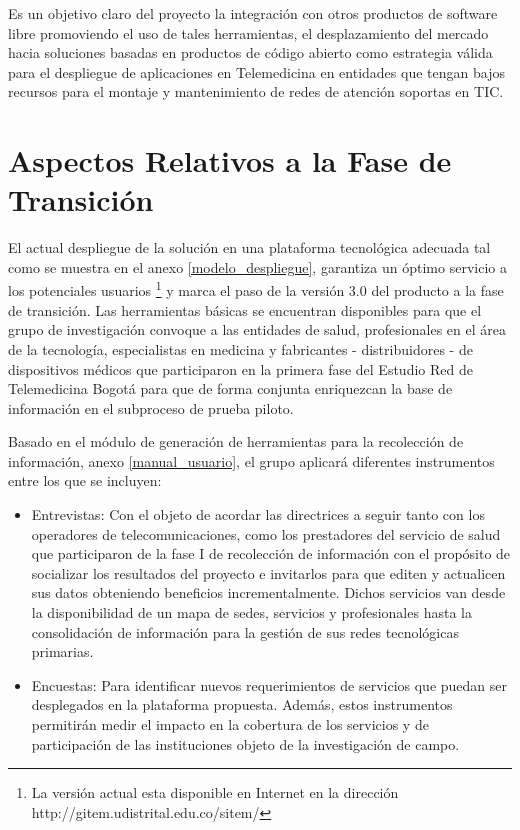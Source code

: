 Es un objetivo claro del proyecto la integración con otros productos de software libre promoviendo el uso de tales herramientas, el desplazamiento del mercado hacia soluciones basadas en productos de código abierto como estrategia válida para el despliegue de aplicaciones en Telemedicina en entidades que tengan bajos recursos para el montaje y mantenimiento de redes de atención soportas en TIC.

\section {Aspectos Relativos a la Fase de Transición}

El actual despliegue de la solución en una plataforma tecnológica adecuada tal como se muestra en el anexo \ref{modelo_despliegue}, garantiza un óptimo servicio a los potenciales usuarios \footnote{La versión actual esta disponible en Internet en la dirección http://gitem.udistrital.edu.co/sitem/} y marca el paso de la versión 3.0 del producto a la fase de transición. Las herramientas básicas se encuentran disponibles para que el grupo de investigación convoque a las entidades de salud, profesionales en el área de la tecnología, especialistas en medicina y fabricantes - distribuidores - de dispositivos médicos que participaron en la primera fase del Estudio Red de Telemedicina Bogotá \cite{aparicio2000} para que de forma conjunta enriquezcan la base de información en el subproceso de prueba piloto.

Basado en el módulo de generación de herramientas para la recolección de información, anexo \ref{manual_usuario}, el grupo aplicará diferentes instrumentos entre los que se incluyen:

\begin{itemize}
\item Entrevistas: Con el objeto de acordar las directrices a seguir tanto con los operadores de telecomunicaciones, como los prestadores del servicio de salud que participaron de la fase I de recolección de información con el propósito de socializar los resultados del proyecto e invitarlos para que editen y actualicen sus datos obteniendo beneficios incrementalmente. Dichos servicios van desde la disponibilidad de un mapa de sedes, servicios y profesionales hasta la consolidación de información para la gestión de sus redes tecnológicas primarias.

\item Encuestas: Para identificar nuevos requerimientos de servicios que puedan ser desplegados en la plataforma propuesta. Además, estos instrumentos permitirán medir el impacto en la cobertura de los servicios y de participación de las instituciones objeto de la investigación de campo.
\end{itemize}

